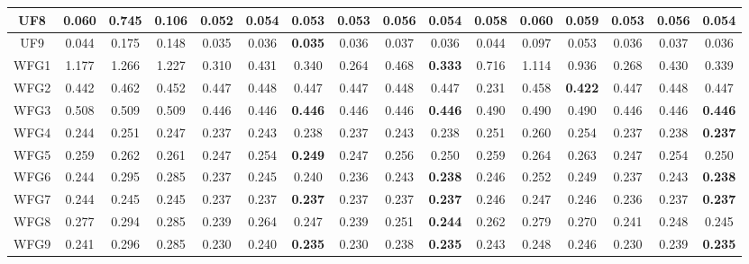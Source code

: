 \begin{table}[]
{\begin{tabular}{c|c|c|c|c|c|c|c|c|c|c|c|c|c|c|c|}
\multicolumn{1}{|c|}{UF8} & 0.060 & 0.745 & 0.106 & 0.052 & 0.054 & \textbf{0.053} & 0.053 & 0.056 & 0.054 & 0.058 & 0.060 & 0.059 & 0.053 & 0.056 & 0.054 \\ \hline
\multicolumn{1}{|c|}{UF9} & 0.044 & 0.175 & 0.148 & 0.035 & 0.036 & \textbf{0.035} & 0.036 & 0.037 & 0.036 & 0.044 & 0.097 & 0.053 & 0.036 & 0.037 & 0.036 \\ \hline
\multicolumn{1}{|c|}{WFG1} & 1.177 & 1.266 & 1.227 & 0.310 & 0.431 & 0.340 & 0.264 & 0.468 & \textbf{0.333} & 0.716 & 1.114 & 0.936 & 0.268 & 0.430 & 0.339 \\ \hline
\multicolumn{1}{|c|}{WFG2} & 0.442 & 0.462 & 0.452 & 0.447 & 0.448 & 0.447 & 0.447 & 0.448 & 0.447 & 0.231 & 0.458 & \textbf{0.422} & 0.447 & 0.448 & 0.447 \\ \hline
\multicolumn{1}{|c|}{WFG3} & 0.508 & 0.509 & 0.509 & 0.446 & 0.446 & \textbf{0.446} & 0.446 & 0.446 & \textbf{0.446} & 0.490 & 0.490 & 0.490 & 0.446 & 0.446 & \textbf{0.446} \\ \hline
\multicolumn{1}{|c|}{WFG4} & 0.244 & 0.251 & 0.247 & 0.237 & 0.243 & 0.238 & 0.237 & 0.243 & 0.238 & 0.251 & 0.260 & 0.254 & 0.237 & 0.238 & \textbf{0.237} \\ \hline
\multicolumn{1}{|c|}{WFG5} & 0.259 & 0.262 & 0.261 & 0.247 & 0.254 & \textbf{0.249} & 0.247 & 0.256 & 0.250 & 0.259 & 0.264 & 0.263 & 0.247 & 0.254 & 0.250 \\ \hline
\multicolumn{1}{|c|}{WFG6} & 0.244 & 0.295 & 0.285 & 0.237 & 0.245 & 0.240 & 0.236 & 0.243 & \textbf{0.238} & 0.246 & 0.252 & 0.249 & 0.237 & 0.243 & \textbf{0.238} \\ \hline
\multicolumn{1}{|c|}{WFG7} & 0.244 & 0.245 & 0.245 & 0.237 & 0.237 & \textbf{0.237} & 0.237 & 0.237 & \textbf{0.237} & 0.246 & 0.247 & 0.246 & 0.236 & 0.237 & \textbf{0.237} \\ \hline
\multicolumn{1}{|c|}{WFG8} & 0.277 & 0.294 & 0.285 & 0.239 & 0.264 & 0.247 & 0.239 & 0.251 & \textbf{0.244} & 0.262 & 0.279 & 0.270 & 0.241 & 0.248 & 0.245 \\ \hline
\multicolumn{1}{|c|}{WFG9} & 0.241 & 0.296 & 0.285 & 0.230 & 0.240 & \textbf{0.235} & 0.230 & 0.238 & \textbf{0.235} & 0.243 & 0.248 & 0.246 & 0.230 & 0.239 & \textbf{0.235} \\ \hline
\end{tabular}%
}
\end{table}

